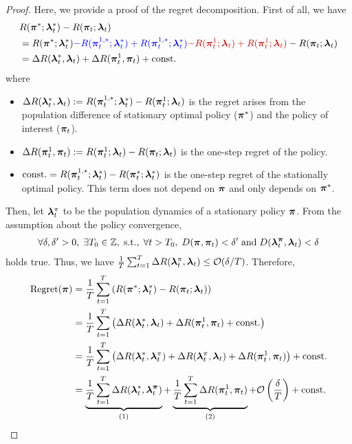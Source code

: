 \begin{proof}
Here, we provide a proof of the regret decomposition. First of all, we have
\begin{align*}
    &R(\bpi^{\ast}; \blambda_t^{\ast}) - R(\bpi_t; \blambda_t) \\
    &= R(\bpi^{\ast}; \blambda_t^{\ast}) \textcolor{blue}{- R(\bpi_t^{1, \ast}; \blambda_t^{\ast}) + R(\bpi_t^{1, \ast}; \blambda_t^{\ast})} \textcolor{dkred}{- R(\bpi_t^{1}; \blambda_t) + R(\bpi_t^{1}; \blambda_t)} - R(\bpi_t; \blambda_t) \\
    &= \Delta R (\blambda_t^{\ast},  \blambda_t) + \Delta R (\bpi_t^{1}, \bpi_t) + \text{const.}
\end{align*}
where 
\begin{itemize}
    \item $\Delta R (\bm{\lambda}_t^{\ast},  \bm{\lambda}_t) := R(\bm{\pi}_t^{1,\ast}; \bm{\lambda}_t^{\ast}) - R(\bm{\pi}_t^{1}; \bm{\lambda}_t)$ is the regret arises from the population difference of stationary optimal policy ($\bm{\pi}^{\ast}$) and the policy of interest ($\bm{\pi}_t$). 
    \item $\Delta R (\bm{\pi}_t^{1}, \bm{\pi}_t) := R(\bm{\pi}_t^{1}; \bm{\lambda}_t) - R(\bm{\pi}_t; \bm{\lambda}_t)$ is the one-step regret of the policy.
    \item $\text{const.} = R(\bm{\pi}_t^{1, \ast}; \bm{\lambda}_t^{\ast}) - R(\bm{\pi}_t^{\ast}; \bm{\lambda}_t^{\ast})$ is the one-step regret of the stationally optimal policy. This term does not depend on $\bm{\pi}$ and only depends on $\bm{\pi}^{\ast}$.
\end{itemize}
Then, let $\bm{\lambda}_t^{\pi}$ to be the population dynamics of a stationary policy $\bm{\pi}$. From the assumption about the policy convergence, 
\begin{align*}
    \forall \delta, \delta' > 0, \; \exists T_0 \in \mathbb{Z}, \; 
    \text{s.t.}, \; \forall t > T_0, \; D(\bm{\pi}, \bm{\pi}_t) < \delta' \; \text{and} \; D(\bm{\lambda}_t^{\bm{\pi}}, \bm{\lambda}_t) < \delta
\end{align*}
holds true.
Thus, we have $\frac{1}{T} \sum_{t=1}^T \Delta R (\bm{\lambda}_t^{\pi}, \bm{\lambda}_t) \leq \mathcal{O}(\delta / T)$. Therefore, 
\begin{align*}
    \text{Regret}(\bm{\pi})
    &= \frac{1}{T} \sum_{t=1}^T \left( R(\bm{\pi}^{\ast}; \bm{\lambda}_t^{\ast}) - R(\bm{\pi}_t; \bm{\lambda}_t) \right) \\
    &= \frac{1}{T} \sum_{t=1}^T \left( \Delta R (\bm{\lambda}_t^{\ast},  \bm{\lambda}_t) + \Delta R (\bm{\pi}_t^{1}, \bm{\pi}_t) + \text{const.} \right) \\
    &= \frac{1}{T} \sum_{t=1}^T \left( \Delta R (\bm{\lambda}_t^{\ast},  \bm{\lambda}_t^{\pi}) + \Delta R (\bm{\lambda}_t^{\pi},  \bm{\lambda}_t) + \Delta R (\bm{\pi}_t^{1}, \bm{\pi}_t) \right) + \text{const.} \\
    &= \underbrace{\frac{1}{T} \sum_{t=1}^T \Delta R (\bm{\lambda}_t^{\ast},  \bm{\lambda}_t^{\bm{\pi}})}_{(1)} + \underbrace{\frac{1}{T} \sum_{t=1}^T \Delta R (\bm{\pi}_t^{1}, \bm{\pi}_t)}_{(2)} + \mathcal{O} \left( \frac{\delta}{T} \right) + \text{const.}
\end{align*}

\vspace{3mm}

\end{proof}

